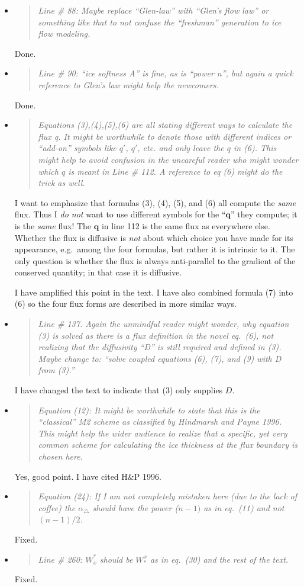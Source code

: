 \documentclass[11pt,reqno]{amsart}
\newcommand{\reply}[2]{
\medskip\medskip
\item  \begin{quote}
\emph{#1}
\end{quote}

\medskip
\noindent #2}
\begin{document}
\begin{itemize}
\reply{Line \# 88: Maybe replace ``Glen-law'' with ``Glen's flow law'' or something like that to not confuse the ``freshman'' generation to ice flow modeling.}
{Done.}

\reply{Line \# 90: ``ice softness A'' is fine, as is ``power n'', but again a quick reference to Glen's law might help the newcomers.}
{Done.}

\reply{Equations (3),(4),(5),(6) are all stating different ways to calculate the flux q. It might be worthwhile to denote those with different indices or ``add-on'' symbols like $q'$, $q'$, etc. and only leave the $q$ in (6). This might help to avoid confusion in the uncareful reader who might wonder which $q$ is meant in Line \# 112. A reference to eq (6) might do the trick as well.}
{I want to emphasize that formulas (3), (4), (5), and (6) all compute the \emph{same} flux.  Thus I \emph{do not} want to use different symbols for the ``$\mathbf{q}$'' they compute; it is the \emph{same} flux!  The $\mathbf{q}$ in line 112 is the same flux as everywhere else.  Whether the flux is diffusive is \emph{not} about which choice you have made for its appearance, e.g.~among the four formulas, but rather it is intrinsic to it.  The only question is whether the flux is always anti-parallel to the gradient of the conserved quantity; in that case it is diffusive.

I have amplified this point in the text.  I have also combined formula (7) into (6) so the four flux forms are described in more similar ways.}

\reply{Line \# 137. Again the unmindful reader might wonder, why equation (3) is solved as there is a flux definition in the novel eq.~(6), not realizing that the diffusivity ``D'' is still required and defined in (3). Maybe change to: ``solve coupled equations (6), (7), and (9) with D from (3).''}
{I have changed the text to indicate that (3) only supplies $D$.}

\reply{Equation (12): It might be worthwhile to state that this is the ``classical'' M2 scheme as classified by Hindmarsh and Payne 1996. This might help the wider audience to realize that a specific, yet very common scheme for calculating the ice thickness at the flux boundary is chosen here.}
{Yes, good point.  I have cited H\&P 1996.}

\reply{Equation (24): If I am not completely mistaken here (due to the lack of coffee) the $\alpha_\triangle$ should have the power ($n-1)$ as in eq.~(11) and not $(n-1)/2$.}
{Fixed.}

\reply{Line \# 260: $W^*_x$ should be $W^x_*$ as in eq.~(30) and the rest of the text.}
{Fixed.}


\end{itemize}
\end{document}
